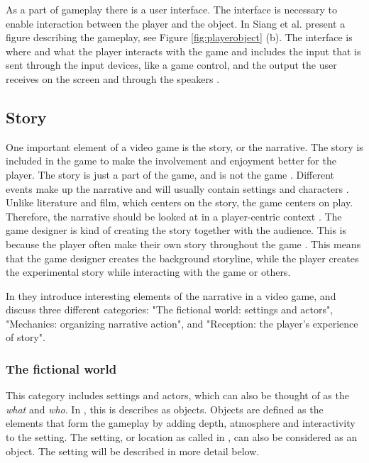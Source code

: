 As a part of gameplay there is a user interface. The interface is necessary to enable interaction between the player and the object. In \cite{umlapproach} Siang et al. present a figure describing the gameplay, see Figure \ref{fig:playerobject} (b). The interface is where and what the player interacts with the game and includes the input that is sent through the input devices, like a game control, and the output the user receives on the screen and through the speakers \cite{umlapproach}.

\subsection{Story}
One important element of a video game is the story, or the narrative. The story is included in the game to make the involvement and enjoyment better for the player. The story is just a part of the game, and is not the game \cite{umlapproach}.  Different events make up the narrative and will usually contain settings and characters \cite{understandingvg}. Unlike literature and film, which centers on the story, the game centers on play. Therefore, the narrative should be looked at in a player-centric context \cite{gametheory}. The game designer is kind of creating the story together with the audience. This is because the player often make their own story throughout the game \cite{umlapproach}. This means that the game designer creates the background storyline, while the player creates the experimental story while interacting with the game or others. 

In \cite{understandingvg} they introduce interesting elements of the narrative in a video game, and discuss three different categories: "The fictional world: settings and actors", "Mechanics: organizing narrative action", and "Reception: the player's experience of story".

\subsubsection{The fictional world}
This category includes settings and actors, which can also be thought of as the \emph{what} and \emph{who}. In \cite{beram}, this is describes as objects. Objects are defined as the elements that form the gameplay by adding depth, atmosphere and interactivity to the setting. The setting, or location as called in \cite{beram}, can also be considered as an object. The setting will be described in more detail below.

